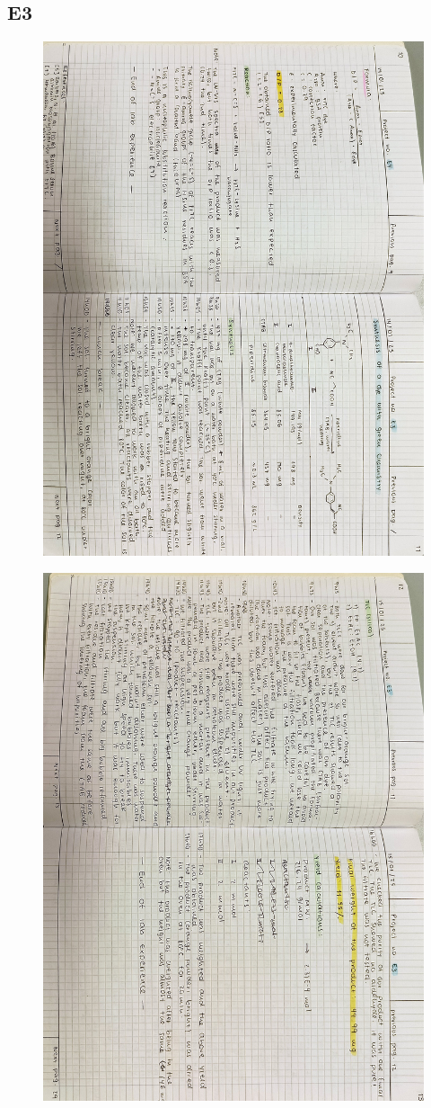 \subsection{E3}
\begin{figure}[H]
	\centering
	\includegraphics[width=0.6\linewidth, angle=90]{../images/compressed/IMG20250123172939.jpg}
\end{figure}
\begin{figure}[H]
	\centering
	\includegraphics[width=0.6\linewidth, angle=90]{../images/compressed/IMG20250123172945.jpg}
\end{figure}


